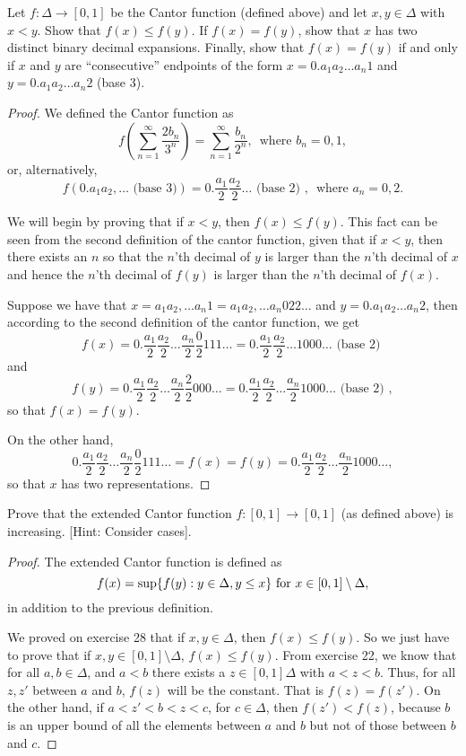 \begin{exercise}{26}
Let $f:\Delta\to[0,1]$ be the Cantor function (defined above) and let $x,y\in\Delta$ with $x<y$. Show that $f(x)\leq f(y)$. If $f(x)=f(y)$, show that $x$ has two distinct binary decimal expansions. Finally, show that $f(x)=f(y)$ if and only if $x$ and $y$ are ``consecutive'' endpoints of the form $x=0.a_1a_2\dots a_n1$ and $y=0.a_1a_2\dots a_n2$ (base 3).
\end{exercise}
\begin{proof}
We defined the Cantor function as 
\[
    f\left(\sum^\infty_{n=1}\frac{2b_n}{3^n}\right)
    =\sum^\infty_{n=1}\frac{b_n}{2^n},\,\text{ where } b_n=0,1,
\]
or, alternatively,
\[
f(0.a_1a_2,\dots\text{ (base 3)})=
0.\frac{a_1}{2}\frac{a_2}{2}\dots\text{ (base 2) },\,\text{ where }a_n=0,2.
\]

We will begin by proving that if $x<y$, then $f(x)\leq f(y)$. This fact can be seen from the second definition of the cantor function, given that if $x<y$, then there exists an $n$ so that the $n$'th decimal of $y$ is larger than the $n$'th decimal of $x$ and hence the $n$'th decimal of $f(y)$ is larger than the $n$'th decimal of $f(x)$.

Suppose we have that $x=a_1a_2,\dots a_n1=a_1a_2,\dots a_n022\dots$ and $y=0.a_1a_2\dots a_n2$, then according to the second definition of the cantor function, we get 
\[
f(x)=0.\frac{a_1}{2}\frac{a_2}{2}\dots\frac{a_n}{2}\frac{0}{2}111\dots 
= 0.\frac{a_1}{2}\frac{a_2}{2}\dots1000\dots
\text{ (base 2) }\]
and
\[
f(y)=0.\frac{a_1}{2}\frac{a_2}{2}\dots \frac{a_n}{2}\frac{2}{2}000\dots =
0.\frac{a_1}{2}\frac{a_2}{2}\dots \frac{a_n}{2}1000\dots \text{ (base 2) },
\]
so that $f(x)=f(y)$.

On the other hand,
\[
0.\frac{a_1}{2}\frac{a_2}{2}\dots\frac{a_n}{2}\frac{0}{2}111\dots = f(x)
= f(y)=0.\frac{a_1}{2}\frac{a_2}{2}\dots \frac{a_n}{2}1000\dots,
\]
so that $x$ has two representations.
\end{proof} 

\begin{exercise}{29}
Prove that the extended Cantor function $f:[0,1]\to[0,1]$ (as defined above) is increasing. [Hint: Consider cases].
\end{exercise}
\begin{proof}
The extended Cantor function is defined as 
\[
f(x)=\sup\{f(y):y\in\Delta, y\leq x\}
\text{ for }x\in[0,1]\setminus\Delta,
\]
in addition to the previous definition.

We proved on exercise 28 that if $x,y\in\Delta$, then $f(x)\leq f(y)$. So we just have to prove that if $x,y\in[0,1]\setminus\Delta$, $f(x)\leq f(y)$. From exercise 22, we know that for all $a,b\in\Delta$, and $a<b$ there exists a $z\in[0,1]\Delta$ with $a<z<b$. Thus, for all $z,z'$ between $a$ and $b$, $f(z)$ will be the constant. That is $f(z)=f(z')$. On the other hand, if $a<z'<b<z<c$, for $c\in\Delta$, then $f(z')<f(z)$, because $b$ is an upper bound of all the elements between $a$ and $b$ but not of those between $b$ and $c$.
\end{proof}
